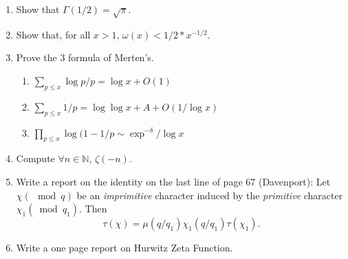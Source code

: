 \documentclass[a4paper,10pt]{article}
\newcommand{\NN}{\mathbb N}
\begin{document}
\begin{enumerate}
\item  Show that $\Gamma(1/2)=\sqrt\pi$.
\item Show that, for all $x>1$, $\omega(x)<1/2*x^{-1/2}$.
\item  Prove the $3$ formula of Merten's.
 \begin{enumerate}
  \item $\sum_{p\leq x} \log p/p = \log x + O (1)$
  \item $\sum_{p\leq x} 1/p = \log\log x +A+ O (1/\log x)$
  \item ${\prod_{p\leq x}\log (1- 1/p}\sim \exp^{-\delta}/\log x$
  \end{enumerate}
  \item Compute $\forall n\in \NN$, $\zeta(-n)$. 
  \item Write a report on the identity on the last line of page 67 (Davenport): Let $\chi(\mod q)$ be an \emph{imprimitive} character induced
  by the \emph{primitive} character $\chi_1(\bmod q_1)$. Then
  $$\tau(\chi)=\mu(q/q_1)\chi_1(q/q_1)\tau(\chi_1).$$
 \item Write a one page report on Hurwitz Zeta Function.
\end{enumerate}
\end{document}
